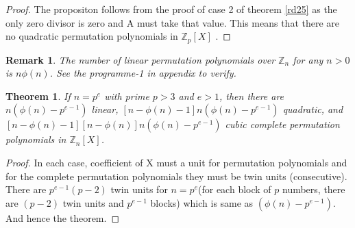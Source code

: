 \documentclass[sn-mathphys,Numbered]{sn-jnl}%
\theoremstyle{thmstyleone}
\newtheorem{theorem}{Theorem}
\theoremstyle{thmstyletwo}
\newtheorem{remark}{Remark}
\theoremstyle{thmstylethree}
\begin{document}
\begin{proof}
The propositon follows from the proof of case 2 of theorem \ref{rd25} as the only zero divisor is zero and A must take that value. This means that there are no quadratic permutation polynomials in $\mathbb{Z}_{p}[X]$ . 
\end{proof}
\begin{remark}
The number of linear permutation polynomials over $\mathbb{Z}_{n}$ for any $n>0$ is $n\phi(n)$. See the programme-1 in appendix to verify. 
\end{remark}
\begin{theorem}
If $n=p^{e}$ with prime $p>3$ and $e>1$, then there are $n (\phi(n)-p^{e-1})$ linear, $[n-\phi(n)-1]n (\phi(n)-p^{e-1})$ quadratic, and $[n-\phi(n)-1][n-\phi(n)]n (\phi(n)-p^{e-1})$ cubic complete permutation polynomials in $\mathbb{Z}_{n}[X]$.
\end{theorem}

\begin{proof}
In each case, coefficient of X must a unit for permutation polynomials and for the complete permutation polynomials they must be twin units (consecutive). There are $p^{e-1}(p-2)$ twin units for $n=p^{e}$(for each block of $p$ numbers, there are $(p-2)$ twin units and $p^{e-1}$ blocks) which is same as $(\phi(n)-p^{e-1})$. And hence the theorem.
\end{proof}
\end{document}
